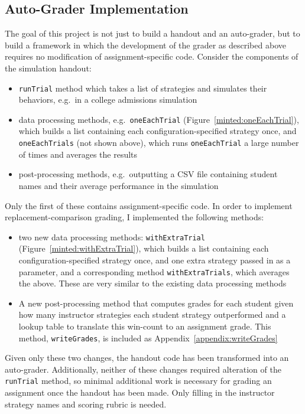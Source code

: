 \documentclass[pageno]{jpaper}
\begin{document}
\subsection*{Auto-Grader Implementation}
The goal of this project is not just to build a handout and an auto-grader, but to build a framework in which the development of the grader as described above requires no modification of assignment-specific code.
Consider the components of the simulation handout:
\begin{itemize}
\item
  \texttt{runTrial} method which takes a list of strategies and simulates their behaviors, e.g.\ in a college admissions simulation
\item
  data processing methods, e.g.\ \texttt{oneEachTrial} (Figure~\ref{minted:oneEachTrial}), which builds a list containing each configuration-specified strategy once, and \texttt{oneEachTrials} (not shown above), which runs \texttt{oneEachTrial} a large number of times and averages the results
\item
  post-processing methods, e.g.\ outputting a CSV file containing student names and their average performance in the simulation
\end{itemize}

Only the first of these contains assignment-specific code.
In order to implement replacement-comparison grading, I implemented the following methods:

\begin{itemize}
\item
  two new data processing methods: \texttt{withExtraTrial} (Figure~\ref{minted:withExtraTrial}), which builds a list containing each configuration-specified strategy once, and one extra strategy passed in as a parameter, and a corresponding method \texttt{withExtraTrials}, which averages the above.
  These are very similar to the existing data processing methods
\item
  A new post-processing method that computes grades for each student given how many instructor strategies each student strategy outperformed and a lookup table to translate this win-count to an assignment grade.
  This method, \texttt{writeGrades}, is included as Appendix~\ref{appendix:writeGrades}
\end{itemize}

Given only these two changes, the handout code has been transformed into an auto-grader.
Additionally, neither of these changes required alteration of the \texttt{runTrial} method, so minimal additional work is necessary for grading an assignment once the handout has been made.
Only filling in the instructor strategy names and scoring rubric is needed.
\end{document}
